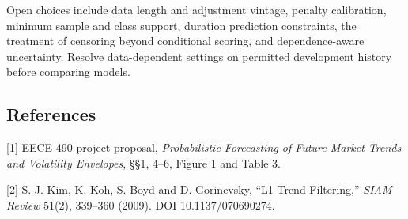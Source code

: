 \documentclass[10pt,letterpaper]{article}
\begin{document}
\par{}\par\smallskip

Open choices include data length and adjustment vintage, penalty calibration, minimum sample and class support, duration prediction constraints, the treatment of censoring beyond conditional scoring, and dependence-aware uncertainty. Resolve data-dependent settings on permitted development history before comparing models.\par

\subsection*{References}

[1] EECE 490 project proposal, \emph{Probabilistic Forecasting of Future Market Trends and Volatility Envelopes}, \S\S 1, 4--6, Figure 1 and Table 3.\par

[2] S.-J. Kim, K. Koh, S. Boyd and D. Gorinevsky, ``L1 Trend Filtering,'' \emph{SIAM Review} 51(2), 339--360 (2009). DOI 10.1137/070690274.\par
\end{document}
